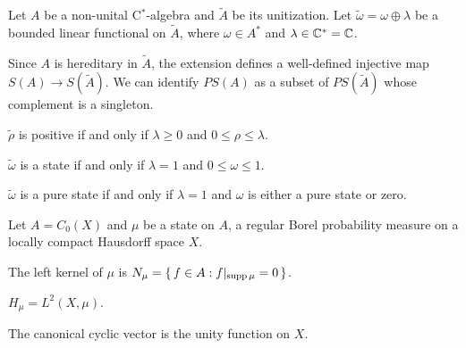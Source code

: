 \documentclass{../../large}
\begin{document}
\begin{prb}
Let $A$ be a non-unital C$^*$-algebra and $\tilde A$ be its unitization.
Let $\tilde\omega=\omega\oplus\lambda$ be a bounded linear functional on $\tilde A$, where $\omega\in A^*$ and $\lambda\in\mathbb{C}^*=\mathbb{C}$.

Since $A$ is hereditary in $\tilde A$, the extension defines a well-defined injective map $S(A)\to S(\tilde A)$.
We can identify $PS(A)$ as a subset of $PS(\tilde A)$ whose complement is a singleton.
\begin{parts}
\item $\tilde\rho$ is positive if and only if $\lambda\ge0$ and $0\le\rho\le\lambda$.
\item $\tilde\omega$ is a state if and only if $\lambda=1$ and $0\le\omega\le1$.
\item $\tilde\omega$ is a pure state if and only if $\lambda=1$ and $\omega$ is either a pure state or zero.
\end{parts}
\end{prb}


\begin{prb}[Representations of $C_0(X)$]
Let $A=C_0(X)$ and $\mu$ be a state on $A$, a regular Borel probability measure on a locally compact Hausdorff space $X$.
\begin{parts}
\item The left kernel of $\mu$ is $N_\mu=\{\,f\in A:f|_{\operatorname{supp}\mu}=0\,\}$.
\item $H_\mu=L^2(X,\mu)$.
\item The canonical cyclic vector is the unity function on $X$.
\end{parts}
\end{prb}

\begin{prb}[Representations of $K(H)$]
\end{prb}

\begin{prb}
\end{prb}


\begin{prb}
\end{prb}


\begin{prb}
\end{prb}

\begin{prb}
\end{prb}
\end{document}
